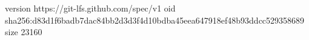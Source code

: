 version https://git-lfs.github.com/spec/v1
oid sha256:d83d1f6badb7dac84bb2d3d3f4d10bdba45eea647918ef48b93ddcc529358689
size 23160
